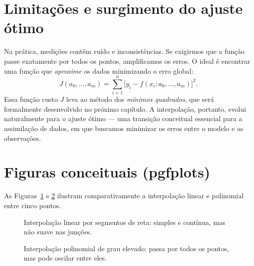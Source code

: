 \section{Limitações e surgimento do ajuste ótimo}
Na prática, medições contêm ruído e inconsistências. Se exigirmos que a função passe exatamente por todos os pontos, amplificamos os erros.  
O ideal é encontrar uma função que \emph{aproxime} os dados minimizando o erro global:
\begin{equation}
J(a_0,\dots,a_m) = \sum_{i=1}^{n} \big[y_i - f(x_i; a_0,\dots,a_m)\big]^2.
\label{eq:min-squares-cost}
\end{equation}
Essa função custo $J$ leva ao método dos \emph{mínimos quadrados}, que será formalmente desenvolvido no próximo capítulo. A interpolação, portanto, evolui naturalmente para o ajuste ótimo — uma transição conceitual essencial para a assimilação de dados, em que buscamos minimizar os erros entre o modelo e as observações.

\section{Figuras conceituais (pgfplots)}
As Figuras~\ref{fig:interp-linear} e \ref{fig:interp-poly} ilustram comparativamente a interpolação linear e polinomial entre cinco pontos.

\begin{figure}[h!]
\centering
{}
\caption{Interpolação linear por segmentos de reta: simples e contínua, mas não suave nas junções.}
\label{fig:interp-linear}
\end{figure}

\begin{figure}[h!]
\centering
{}
\caption{Interpolação polinomial de grau elevado: passa por todos os pontos, mas pode oscilar entre eles.}
\label{fig:interp-poly}
\end{figure}

